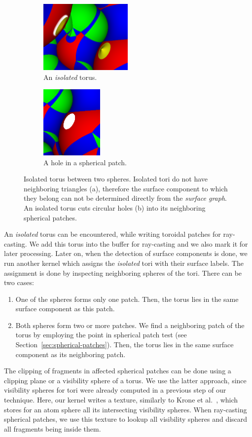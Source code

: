 \begin{figure}[htp]
  \centering
  \begin{subfigure}[t]{0.55\columnwidth}
    \centering
    \includegraphics[height=1.4in]{image/isolated-cutaway2.png}
    \caption{An \textit{isolated} torus.}
		\label{fig:isolated-cutaway}
  \end{subfigure}%
  \quad
  \begin{subfigure}[t]{0.4\columnwidth}
    \centering
    \includegraphics[height=1.4in]{image/isolated-hole.png}
    \caption{A hole in a spherical patch.}
		\label{fig:isolated-hole}
  \end{subfigure}
\caption{Isolated torus between two spheres.
	Isolated tori do not have neighboring triangles (a), therefore the surface component to which they belong can not be determined directly from the \textit{surface graph}.
	An isolated torus cuts circular holes (b) into its neighboring spherical patches.}
\end{figure}

An \textit{isolated} torus can be encountered, while writing toroidal patches for ray-casting.
We add this torus into the buffer for ray-casting and we also mark it for later processing.
Later on, when the detection of surface components is done, we run another kernel which assigns the \textit{isolated} tori with their surface labels.
The assignment is done by inspecting neighboring spheres of the tori.
There can be two cases:
\begin{enumerate}
  \item One of the spheres forms only one patch. Then, the torus lies in the same surface component as this patch.
	\item Both spheres form two or more patches. We find a neighboring patch of the torus by employing the point in spherical patch test (see Section~\ref{sec:spherical-patches}). Then, the torus lies in the same surface component as its neighboring patch.
\end{enumerate}

The clipping of fragments in affected spherical patches can be done using a clipping plane or a visibility sphere of a torus.
We use the latter approach, since visibility spheres for tori were already computed in a previous step of our technique.
Here, our kernel writes a texture, similarly to Krone et al.~\cite{krone2011parallel}, which stores for an atom sphere all its intersecting visibility spheres.
When ray-casting spherical patches, we use this texture to lookup all visibility spheres and discard all fragments being inside them.
